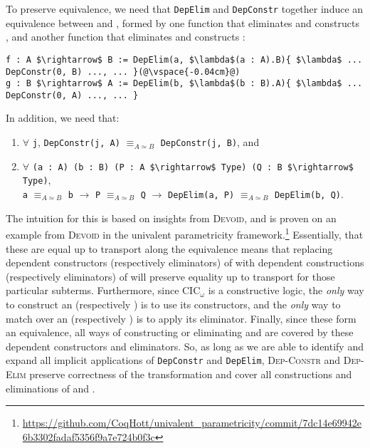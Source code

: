 To preserve equivalence, we need that \lstinline{DepElim} and \lstinline{DepConstr} together induce an equivalence between \A and \B,
formed by one function that eliminates \A and constructs \B, and another function that eliminates \B and constructs \A:

\begin{lstlisting}
f : A $\rightarrow$ B := DepElim(a, $\lambda$(a : A).B){ $\lambda$ ... DepConstr(0, B) ..., ... }(@\vspace{-0.04cm}@)
g : B $\rightarrow$ A := DepElim(b, $\lambda$(b : B).A){ $\lambda$ ... DepConstr(0, A) ..., ... }
\end{lstlisting}
In addition, we need that:

\begin{enumerate}
\item $\forall$ \lstinline{j}, \lstinline{DepConstr(j, A)} $\equiv_{A \simeq B}$ \lstinline{DepConstr(j, B)}, and
\item $\forall$ \lstinline{(a : A) (b : B) (P : A $\rightarrow$ Type) (Q : B $\rightarrow$ Type)},\\ \lstinline{a} $\equiv_{A \simeq B}$ \lstinline{b} $\rightarrow$ \lstinline{P} $\equiv_{A \simeq B}$ \lstinline{Q} $\rightarrow$ \lstinline{DepElim(a, P)} $\equiv_{A \simeq B}$ \lstinline{DepElim(b, Q)}.
\end{enumerate}
The intuition for this is based on insights from \textsc{Devoid},
and is proven on an example from \textsc{Devoid} in the univalent parametricity framework.\footnote{\url{https://github.com/CoqHott/univalent_parametricity/commit/7dc14e69942e6b3302fadaf5356f9a7e724b0f3c}}
Essentially, that these are equal up to transport along the equivalence means that replacing dependent constructors (respectively eliminators) of \A
with dependent constructions (respectively eliminators) of \B will preserve equality up to transport for those particular subterms.
Furthermore, since CIC$_{\omega}$ is a constructive logic, the \textit{only} way to construct an \A (respectively \B) is to use its constructors,
and the \textit{only} way to match over an \A (respectively \B) is to apply its eliminator.
Finally, since these form an equivalence, all ways of constructing or eliminating \A and \B are covered by these dependent constructors and eliminators.
So, as long as we are able to identify and expand all implicit applications of \lstinline{DepConstr} and \lstinline{DepElim},
\textsc{Dep-Constr} and \textsc{Dep-Elim} preserve correctness of the transformation and cover all constructions and eliminations of \A and \B.

